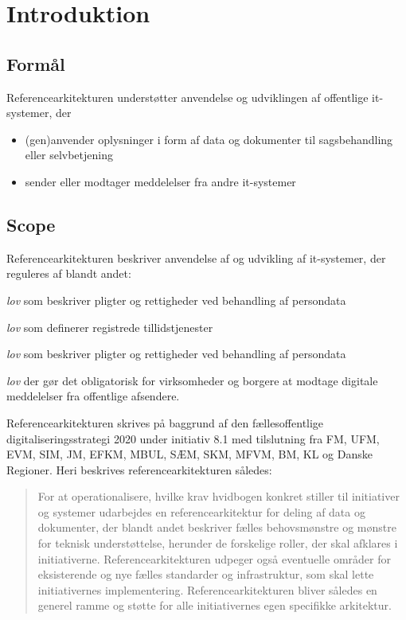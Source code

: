 \section{Introduktion}\label{introduktion}

\subsection{Formål}\label{formuxe5l}

Referencearkitekturen understøtter anvendelse og udviklingen af
offentlige it-systemer, der

\begin{itemize}
\tightlist
\item
  (gen)anvender oplysninger i form af data og dokumenter til
  sagsbehandling eller selvbetjening
\item
  sender eller modtager meddelelser fra andre it-systemer
\end{itemize}

\subsection{Scope}\label{scope}

Referencearkitekturen beskriver anvendelse af og udvikling af
it-systemer, der reguleres af blandt andet:

\begin{description}
\tightlist
\item[EU databeskyttelse]
\emph{lov} som beskriver pligter og rettigheder ved behandling af
persondata
\item[EU eIDAS]
\emph{lov} som definerer registrede tillidstjenester
\item[Persondata lov]
\emph{lov} som beskriver pligter og rettigheder ved behandling af
persondata
\item[Lov om Digital Post]
\emph{lov} der gør det obligatorisk for virksomheder og borgere at
modtage digitale meddelelser fra offentlige afsendere.
\end{description}

Referencearkitekturen skrives på baggrund af den fællesoffentlige
digitaliseringsstrategi 2020 under initiativ 8.1 med tilslutning fra FM,
UFM, EVM, SIM, JM, EFKM, MBUL, SÆM, SKM, MFVM, BM, KL og Danske
Regioner. Heri beskrives referencearkitekturen således:

\begin{quote}
For at operationalisere, hvilke krav hvidbogen konkret stiller til
initiativer og systemer udarbejdes en referencearkitektur for deling af
data og dokumenter, der blandt andet beskriver fælles behovsmønstre og
mønstre for teknisk understøttelse, herunder de forskelige roller, der
skal afklares i initiativerne. Referencearkitekturen udpeger også
eventuelle områder for eksisterende og nye fælles standarder og
infrastruktur, som skal lette initiativernes implementering.
Referencearkitekturen bliver således en generel ramme og støtte for alle
initiativernes egen specifikke arkitektur.
\end{quote}

